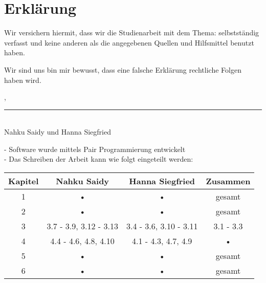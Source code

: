 
\thispagestyle{empty}

\section*{Erkl\"arung}
\vspace*{2em}

Wir versichern hiermit, dass wir die Studienarbeit mit dem Thema: {\itshape \titel} selbstst\"andig verfasst und keine anderen als die angegebenen Quellen und Hilfsmittel benutzt haben.

Wir sind uns bin mir bewusst, dass eine falsche Erklärung rechtliche Folgen haben wird.

\vspace{3em}

\abgabeort, \datumAbgabe
\vspace{4em}

\rule{6.8cm}{0.4pt}\\
Nahku Saidy und Hanna Siegfried

\vspace{4em}

- Software wurde mittels Pair Programmierung entwickelt \\
- Das Schreiben der Arbeit kann wie folgt eingeteilt werden:

\begin{tabular}{c c c c}
\textbf{Kapitel} & \textbf{Nahku Saidy} & \textbf{Hanna Siegfried} & \textbf{Zusammen} \\ 
\hline 
1 & • & • & gesamt \\ 
2 & • & • & gesamt \\ 
3 & 3.7 - 3.9, 3.12 - 3.13 & 3.4 - 3.6, 3.10 - 3.11 & 3.1 - 3.3 \\ 
4 & 4.4 - 4.6, 4.8, 4.10 & 4.1 - 4.3, 4.7, 4.9 & • \\ 
5 & • & • & gesamt \\ 
6 & • & • & gesamt \\  
\end{tabular} 